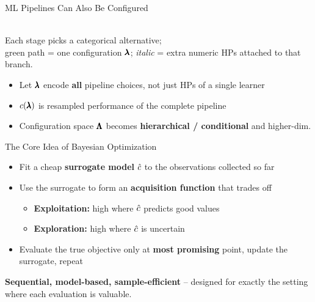 \documentclass[main]{subfiles}
\begin{document}
\begin{frame}{ML Pipelines Can Also Be Configured}
\begin{center}
\\[0.1cm]
  {\footnotesize Each stage picks a categorical alternative;\\
  green path = one configuration $\pmb{\lambda}$; \textit{italic} = extra numeric HPs attached to that branch.}
  \end{center}
  \begin{itemize}
      \item Let $\pmb{\lambda}$ encode \textbf{all} pipeline choices, not just HPs of a single learner
      \item $c(\pmb{\lambda})$ is resampled performance of the complete pipeline
      \item Configuration space $\pmb{\Lambda}$ becomes \textbf{hierarchical / conditional} and higher-dim.
  \end{itemize}
\end{frame}


\begin{frame}{The Core Idea of Bayesian Optimization}
\begin{itemize}
    \item Fit a cheap \textbf{surrogate model} $\hat{c}$ to the observations collected so far
    \item Use the surrogate to form an \textbf{acquisition function} that trades off
    \begin{itemize}
        \item \textbf{Exploitation:} high where $\hat{c}$ predicts good values
        \item \textbf{Exploration:} high where $\hat{c}$ is uncertain
    \end{itemize}
    \item Evaluate the true objective only at \textbf{most promising} point, update the surrogate, repeat
\end{itemize}
\vspace{0.3cm}
\begin{center}
\textbf{Sequential, model-based, sample-efficient} -- designed for exactly the setting where each evaluation is valuable.
\end{center}
\end{frame}
\end{document}
